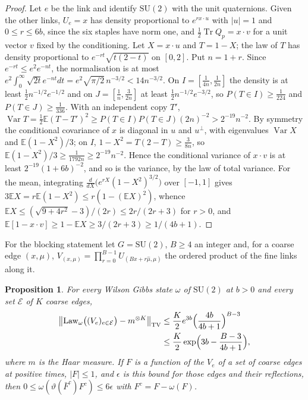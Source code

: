 \documentclass[aps,prd,twocolumn,superscriptaddress,nofootinbib,longbibliography,floatfix,amsmath,amssymb,10pt]{revtex4-2}
\newtheorem{proposition}[theorem]{Proposition}
\theoremstyle{definition}
\theoremstyle{remark}
\newcommand{\E}{\mathbb{E}}
\newcommand{\SU}{\mathrm{SU}}
\newcommand{\Tr}{\operatorname{Tr}}
\newcommand{\Var}{\operatorname{Var}}
\begin{document}
\begin{proof}
Let $e$ be the link and identify $\SU(2)$ with the unit quaternions. Given the
other links, $U_e=x$ has density proportional to $e^{rx\cdot u}$ with $|u|=1$
and $0\le r\le6b$, since the six staples have norm one, and $\frac12\Tr Q_p=x\cdot
v$ for a unit vector $v$ fixed by the conditioning. Let $X=x\cdot u$ and
$T=1-X$; the law of $T$ has density proportional to $e^{-rt}\sqrt{t(2-t)}$ on
$[0,2]$. Put $n=1+r$. Since $e^{-rt}\le e^2e^{-nt}$, the normalisation is at
most $e^2\int_0^\infty\sqrt{2t}e^{-nt}dt=e^2\sqrt{\pi/2}\,n^{-3/2}<14n^{-3/2}$.
On $I=[\frac1{4n},\frac1{2n}]$ the density is at least
$\frac12n^{-1/2}e^{-1/2}$ and on $J=[\frac1n,\frac3{2n}]$ at least
$\frac12n^{-1/2}e^{-3/2}$, so $P(T\in I)\ge\frac1{224}$ and
$P(T\in J)\ge\frac1{336}$. With an independent copy $T'$,
$\Var T=\frac12\E(T-T')^2\ge P(T\in I)P(T\in J)(2n)^{-2}>2^{-19}n^{-2}$. By
symmetry the conditional covariance of $x$ is diagonal in $u$ and
$u^\perp$, with eigenvalues $\Var X$ and $\E(1-X^2)/3$; on $I$,
$1-X^2=T(2-T)\ge\frac3{8n}$, so $\E(1-X^2)/3\ge\frac1{1792n}\ge2^{-19}n^{-2}$.
Hence the conditional variance of $x\cdot v$ is at least $2^{-19}(1+6b)^{-2}$,
and so is the variance, by the law of total variance. For the mean, integrating
$\frac d{dX}\bigl(e^{rX}(1-X^2)^{3/2}\bigr)$ over $[-1,1]$ gives
$3\E X=r\E(1-X^2)\le r(1-(\E X)^2)$, whence
$\E X\le(\sqrt{9+4r^2}-3)/(2r)\le2r/(2r+3)$ for $r>0$, and
$\E[1-x\cdot v]\ge1-\E X\ge3/(2r+3)\ge1/(4b+1)$.
\end{proof}

For the blocking statement let $G=\SU(2)$, $B\ge4$ an integer and, for a
coarse edge $(x,\mu)$, $V_{(x,\mu)}=\prod_{r=0}^{B-1}U_{(Bx+r\hat\mu,\mu)}$ the
ordered product of the fine links along it.

\begin{proposition}\label{prop:blocking}
For every Wilson Gibbs state $\omega$ of $\SU(2)$ at $b>0$ and every set $\mathcal
E$ of $K$ coarse edges,
\[
\begin{split}
\bigl\|\mathrm{Law}_\omega\bigl((V_e)_{e\in\mathcal E}\bigr)-m^{\otimes K}\bigr\|_{\mathrm{TV}}
&\le\frac K2e^{3b}\Bigl(\frac{4b}{4b+1}\Bigr)^{B-3}\\
&\le\frac K2\exp\Bigl(3b-\frac{B-3}{4b+1}\Bigr),
\end{split}
\]
where $m$ is the Haar measure. If $F$ is a function of the $V_e$ of a set of
coarse edges at positive times, $|F|\le1$, and $\epsilon$ is this bound for
those edges and their reflections, then
$0\le\omega(\vartheta(\bar F^c)F^c)\le6\epsilon$ with $F^c=F-\omega(F)$.
\end{proposition}
\end{document}
